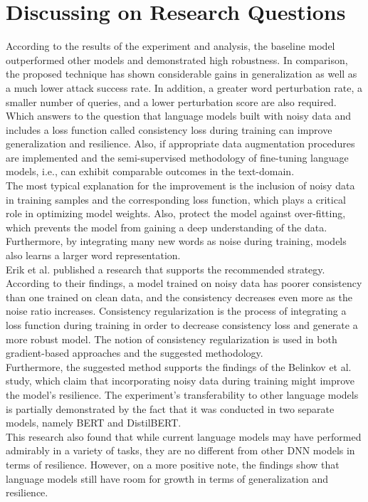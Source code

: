 \documentclass[%
	BCOR=8mm, %
	DIV=12,
	toc=bibliography, %
	toc=listof, %
	oneside, %
	egregdoesnotlikesansseriftitles, %
	]{scrbook}
\begin{document}
\section{Discussing on Research Questions}
According to the results of the experiment and analysis, the baseline model outperformed other models and demonstrated high robustness. In comparison, the proposed technique has shown considerable gains in generalization as well as a much lower attack success rate. In addition, a greater word perturbation rate, a smaller number of queries, and a lower perturbation score are also required. \\
Which answers to the question that language models built with noisy data and includes a loss function called consistency loss during training can improve generalization and resilience. Also, if appropriate data augmentation procedures are implemented and the semi-supervised methodology of fine-tuning language models, i.e., can exhibit comparable outcomes in the text-domain.\\
The most typical explanation for the improvement is the inclusion of noisy data in training samples and the corresponding loss function, which plays a critical role in optimizing model weights. Also, protect the model against over-fitting, which prevents the model from gaining a deep understanding of the data. Furthermore, by integrating many new words as noise during training, models also learns a larger word representation. \\
Erik et al. \cite{englesson_consistency_2021} published a research that supports the recommended strategy. According to their findings, a model trained on noisy data has poorer consistency than one trained on clean data, and the consistency decreases even more as the noise ratio increases. Consistency regularization is the process of integrating a loss function during training in order to decrease consistency loss and generate a more robust model. The notion of consistency regularization is used in both gradient-based approaches \cite{miyato_adversarial_2017} and the suggested methodology.\\
Furthermore, the suggested method supports the findings of the Belinkov et al.\cite{belinkov_synthetic_2018} study, which claim that incorporating noisy data during training might improve the model's resilience. The experiment's transferability to other language models is partially demonstrated by the fact that it was conducted in two separate models, namely BERT and DistilBERT.\\
This research also found that while current language models may have performed admirably in a variety of tasks, they are no different from other DNN models in terms of resilience. However, on a more positive note, the findings show that language models still have room for growth in terms of generalization and resilience.
\end{document}
